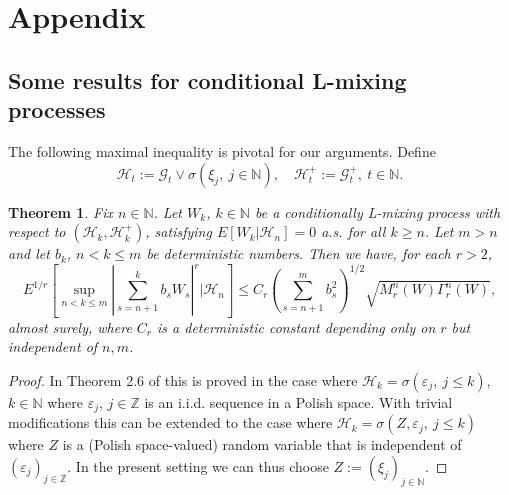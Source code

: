 \documentclass[a4paper]{article}
\newtheorem{theorem}{Theorem}[section]
\begin{document}
\section{Appendix}\label{sec_app}

\subsection{Some results for conditional L-mixing processes}\label{mixing_more}

The following maximal inequality is pivotal for our arguments.
Define $$
\mathcal{H}_t:=\mathcal{G}_t\vee\sigma(\xi_j,\ j\in\mathbb{N}),\quad
\mathcal{H}^+_t:=\mathcal{G}^+_t,\ t\in\mathbb{N}.
$$

\begin{theorem}\label{estim}
Fix $n\in \mathbb{N}$. Let $W_k$, $k\in\mathbb{N}$ be a conditionally L-mixing process with respect to $(\mathcal{H}_k,\mathcal{H}_k^+)$, satisfying
$E[W_k\vert\mathcal{H}_n]=0$ a.s. for all {$k\geq n$}.
Let $m >n$ and let $b_k$, $n< k\leq m$ be deterministic numbers. Then we have,
for each $r>2$,
\begin{equation}\label{mandrill}
E^{1/r}\left[ \sup_{n < k \le m} \left| \sum_{s = n+1}^{k} b_s W_s \right|^r \big\vert\mathcal{H}_n \right]
 \le C_r \left( \sum_{s=n+1}^{m} b_s^2 \right)^{1/2} \sqrt{{M}_r^{n}(W) \Gamma_r^{n}(W)},
\end{equation}
almost surely, where $C_r$ is a deterministic constant depending only on $r$ but independent of $n,m$.
\end{theorem}
\begin{proof}
In Theorem 2.6 of \cite{4} this is proved in the case where $\mathcal{H}_k=
\sigma(\varepsilon_j,\ j\leq k)$, $k\in\mathbb{N}$ where $\varepsilon_j$,
$j\in\mathbb{Z}$
is an i.i.d. sequence in a Polish space. With trivial modifications
this can be extended to the case where $\mathcal{H}_k=
\sigma(Z,\varepsilon_j,\ j\leq k)$ where $Z$ is a (Polish space-valued) random
variable that is independent of $(\varepsilon_j)_{j\in\mathbb{Z}}$. In
the present setting we can thus choose $Z:=(\xi_j)_{j\in\mathbb{N}}$.
\end{proof}
\end{document}
